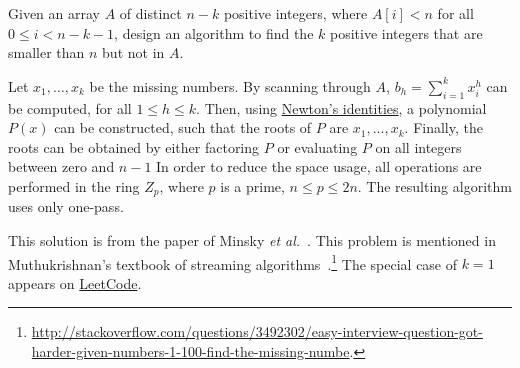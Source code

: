 \begin{Exercise}
Given an array $A$ of distinct $n - k$ positive integers, where $A[i] < n$ for all $0 \leq i < n - k - 1$, design an algorithm to find the $k$ positive integers that are smaller than $n$ but not in $A$.
\end{Exercise}
\begin{Answer}
Let $x_1, \dots, x_k$ be the missing numbers. 
By scanning through $A$, $b_h = \sum_{i=1}^k x_i^h$ can be computed, for all $1 \leq h \leq k$. 
Then, using \href{https://en.wikipedia.org/wiki/Newton\%27s_identities}{Newton's identities}, a polynomial $P(x)$ can be constructed, such that the roots of $P$ are $x_1, \dots, x_k$. 
Finally, the roots can be obtained by either factoring $P$ or evaluating $P$ on all integers between zero and $n - 1$ 
In order to reduce the space usage, all operations are performed in the ring $Z_p$, where $p$ is a prime, $n \leq p \leq 2n$. The resulting algorithm uses only one-pass.
\begin{remark}
This solution is from the paper of Minsky \textit{et al.}~\cite{Minsky2003}. This problem is mentioned in Muthukrishnan's textbook of streaming algorithms~\cite{Muthukrishnan2005}.\footnote{\url{http://stackoverflow.com/questions/3492302/easy-interview-question-got-harder-given-numbers-1-100-find-the-missing-numbe}.} The special case of $k = 1$ appears on \href{https://leetcode.com/problems/missing-number/}{LeetCode}.
\end{remark}
\end{Answer}


